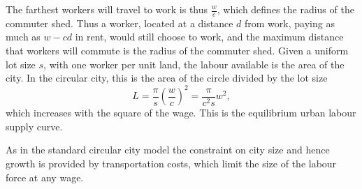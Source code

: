 The farthest workers will travel to work is thus $\frac{w}{{c}}$, which defines the radius of the commuter shed. Thus a worker, located at a distance $d$ from work, paying as much as $w-{c} d$ in rent, would still choose to work, and the maximum distance that workers will commute is the radius of the commuter shed. Given a uniform lot size $s$, with one worker per unit land, the labour available is the area of the city. In the circular city, this is the area of the circle divided by the lot size
\begin{equation}
                 L%
			=\frac{\pi}{s}  \left(\frac{w}{{c}}\right)^2
			=\frac{\pi}{{c}^2 s} w^2, \label{eqn-labour-supply2}
\end{equation}
which increases with the square of the wage. This is the equilibrium urban labour supply curve.

As in the standard circular city model the constraint on city size and hence growth is provided by transportation costs, which limit the size of the labour force at any wage. 





